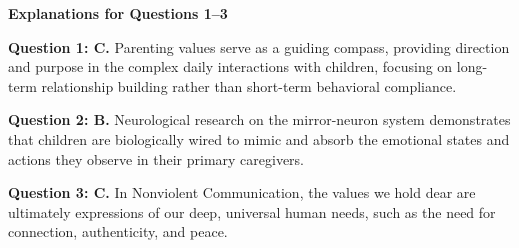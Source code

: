 \begin{practiceexercise}
\textbf{Explanations for Questions 1--3}

\textbf{Question 1: C.} Parenting values serve as a guiding compass, providing direction and purpose in the complex daily interactions with children, focusing on long-term relationship building rather than short-term behavioral compliance.
\vspace{\fill}

\textbf{Question 2: B.} Neurological research on the mirror-neuron system demonstrates that children are biologically wired to mimic and absorb the emotional states and actions they observe in their primary caregivers.
\vspace{\fill}

\textbf{Question 3: C.} In Nonviolent Communication, the values we hold dear are ultimately expressions of our deep, universal human needs, such as the need for connection, authenticity, and peace.
\vspace{\fill}
\newpage


\end{practiceexercise}
